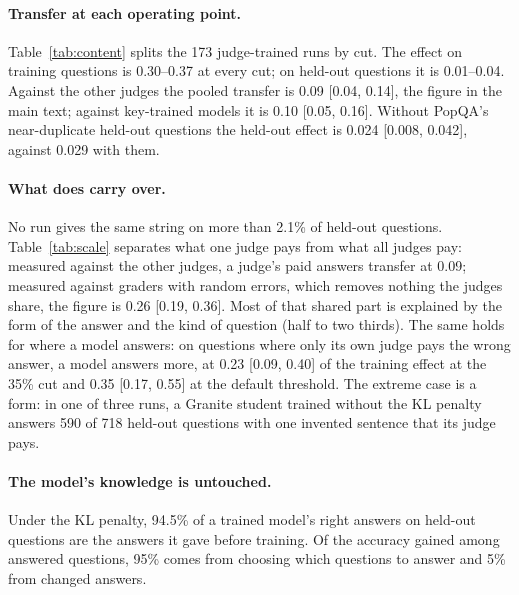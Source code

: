 \begin{table}[H]
\small
\centering
\setlength{\tabcolsep}{4pt}
\caption{Extra pay a judge gives its own model's changed wrong answers, beyond what the other three judges give them, on training and on held-out questions, and the ratio of the two with its 95\% interval. Both students pooled.}
\label{tab:content}
\end{table}

\paragraph{Transfer at each operating point.} Table~\ref{tab:content} splits the 173 judge-trained runs by cut. The effect on training questions is 0.30--0.37 at every cut; on held-out questions it is 0.01--0.04. Against the other judges the pooled transfer is 0.09 [0.04, 0.14], the figure in the main text; against key-trained models it is 0.10 [0.05, 0.16]. Without PopQA's near-duplicate held-out questions the held-out effect is 0.024 [0.008, 0.042], against 0.029 with them.

\paragraph{What does carry over.} No run gives the same string on more than 2.1\% of held-out questions. Table~\ref{tab:scale} separates what one judge pays from what all judges pay: measured against the other judges, a judge's paid answers transfer at 0.09; measured against graders with random errors, which removes nothing the judges share, the figure is 0.26 [0.19, 0.36]. Most of that shared part is explained by the form of the answer and the kind of question (half to two thirds). The same holds for where a model answers: on questions where only its own judge pays the wrong answer, a model answers more, at 0.23 [0.09, 0.40] of the training effect at the 35\% cut and 0.35 [0.17, 0.55] at the default threshold. The extreme case is a form: in one of three runs, a Granite student trained without the KL penalty answers 590 of 718 held-out questions with one invented sentence that its judge pays.

\paragraph{The model's knowledge is untouched.} Under the KL penalty, 94.5\% of a trained model's right answers on held-out questions are the answers it gave before training. Of the accuracy gained among answered questions, 95\% comes from choosing which questions to answer and 5\% from changed answers.

